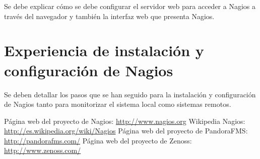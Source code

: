 \documentclass[11pt,a4paper]{article}
\begin{document}
Se debe explicar cómo se debe configurar el servidor web para acceder a Nagios a través del navegador
y  también la interfaz web que presenta Nagios.\\


\section{Experiencia de instalación y configuración de Nagios}

Se deben detallar los pasos que se han seguido para la instalación y configuración de Nagios
tanto para monitorizar el sistema local como sistemas remotos.

\begin{thebibliography}{1}

 Página web del proyecto de Nagios: \url{http://www.nagios.org}
 Wikipedia Nagios: \url{http://es.wikipedia.org/wiki/Nagios}
 Página web del proyecto de PandoraFMS: \url{http://pandorafms.com/}
 Página web del proyecto de Zenoss: \url{http://www.zenoss.com/}
\end{thebibliography}
\end{document}

